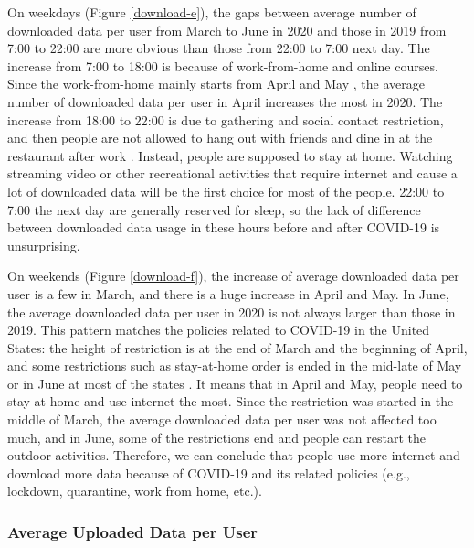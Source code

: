 On weekdays (Figure \ref{download-e}), the gaps between average number of downloaded data per user from March to June in 2020 and those in 2019 from 7:00 to 22:00 are more obvious than those from 22:00 to 7:00 next day. The increase from 7:00 to 18:00 is because of work-from-home and online courses. Since the work-from-home mainly starts from April and May \cite{remotework}, the average number of downloaded data per user in April increases the most in 2020. The increase from 18:00 to 22:00 is due to gathering and social contact restriction, and then people are not allowed to hang out with friends and dine in at the restaurant after work \cite{lockdownsguide}. Instead, people are supposed to stay at home. Watching streaming video or other recreational activities that require internet and cause a lot of downloaded data will be the first choice for most of the people. 22:00 to 7:00 the next day are generally reserved for sleep, so the lack of difference between downloaded data usage in these hours before and after COVID-19 is unsurprising. 

On weekends (Figure \ref{download-f}), the increase of average downloaded data per user is a few in March, and there is a huge increase in April and May. In June, the average downloaded data per user in 2020 is not always larger than those in 2019. This pattern matches the policies related to COVID-19 in the United States: the height of restriction is at the end of March and the beginning of April, and some restrictions such as stay-at-home order is ended in the mid-late of May or in June at most of the states \cite{covid19restriction}. It means that in April and May, people need to stay at home and use internet the most. Since the restriction was started in the middle of March, the average downloaded data per user was not affected too much, and in June, some of the restrictions end and people can restart the outdoor activities. Therefore, we can conclude that people use more internet and download more data because of COVID-19 and its related policies (e.g., lockdown, quarantine, work from home, etc.). 

\subsubsection{Average Uploaded Data per User}
\label{sec:upload-data-per-user-over-hours}


